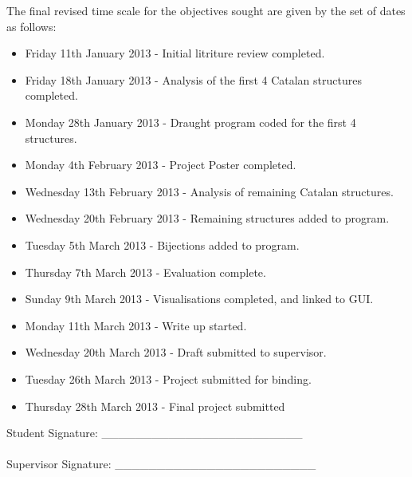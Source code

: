 \documentclass[10pt]{article}
\begin{document}
The final revised time scale for the objectives sought are given by the set of dates as follows:
\begin{itemize}
\renewcommand{\labelitemi}{$\bullet$}

\item Friday 11th January 2013 - Initial litriture review completed.

\item Friday 18th January 2013 - Analysis of the first 4 Catalan structures completed.

\item Monday 28th January 2013 - Draught program coded for the first 4 structures.

\item Monday 4th February 2013 - Project Poster completed.

\item Wednesday 13th February 2013 - Analysis of remaining Catalan structures.

\item Wednesday 20th February 2013 - Remaining structures added to program.

\item Tuesday 5th March 2013 - Bijections added to program.

\item Thursday 7th March 2013 - Evaluation complete. 

\item Sunday 9th March 2013 - Visualisations completed, and linked to GUI.

\item Monday 11th March 2013 - Write up started.

\item Wednesday 20th March 2013 - Draft submitted to supervisor.

\item Tuesday 26th March 2013 - Project submitted for binding.

\item Thursday 28th March 2013 - Final project submitted
\end{itemize}

Student Signature: \_\_\_\_\_\_\_\_\_\_\_\_\_\_\_\_\_\_\_\_\_\_\_\_ \\ \\
Supervisor Signature: \_\_\_\_\_\_\_\_\_\_\_\_\_\_\_\_\_\_\_\_\_\_\_\_



\end{document}

